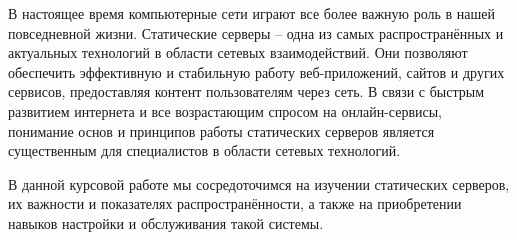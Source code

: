 
В настоящее время компьютерные сети играют все более важную роль в нашей повседневной жизни. Статические серверы – одна из самых распространённых и актуальных технологий в области сетевых взаимодействий. Они позволяют обеспечить эффективную и стабильную работу веб-приложений, сайтов и других сервисов, предоставляя контент пользователям через сеть. В связи с быстрым развитием интернета и все возрастающим спросом на онлайн-сервисы, понимание основ и принципов работы статических серверов является существенным для специалистов в области сетевых технологий. 

В данной курсовой работе мы сосредоточимся на изучении статических серверов, их важности и показателях распространённости, а также на приобретении навыков настройки и обслуживания такой системы.

\clearpage